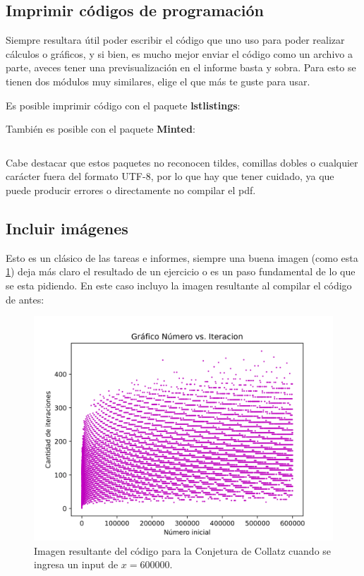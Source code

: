 \documentclass[11pt,letterpaper]{article}
\begin{document}
\subsection*{Imprimir códigos de programación}
Siempre resultara útil poder escribir el código que uno uso para poder realizar cálculos o gráficos, y si bien, es mucho mejor enviar el código como un archivo a parte, aveces tener una previsualización en el informe basta y sobra. Para esto se tienen dos módulos muy similares, elige el que más te guste para usar.\par
Es posible imprimir código con el paquete \textbf{lstlistings}:

También es posible con el paquete \textbf{Minted}:
\begin{mdframed}[backgroundcolor=backcolour]
    \inputminted[]{python}{code.py}
\end{mdframed}

Cabe destacar que estos paquetes no reconocen tildes, comillas dobles o cualquier carácter fuera del formato UTF-8, por lo que hay que tener cuidado, ya que puede producir errores o directamente no compilar el pdf.
\subsection*{Incluir imágenes}

Esto es un clásico de las tareas e informes, siempre una buena imagen (como esta \ref{code1}) deja más claro el resultado de un ejercicio o es un paso fundamental de lo que se esta pidiendo. En este caso incluyo la imagen resultante al compilar el código de antes:
\begin{figure}[H]
        \centering
        \includegraphics[]{foto.png}
        \caption{Imagen resultante del código para la Conjetura de Collatz cuando se ingresa un input de $x=600000$.}
        \label{code1}
\end{figure}
\end{document}
